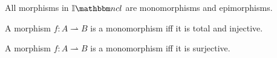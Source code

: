 \begin{myfact}
	All morphisms in $\catINCL$ are monomorphisms and epimorphisms.
\end{myfact}

\begin{myfact}
	A morphism $f: A \rightharpoonup B$ is a monomorphism iff it is total and injective.
\end{myfact}

\begin{myfact}
	A morphism $f: A \rightharpoonup B$ is a monomorphism iff it is surjective.
\end{myfact}

